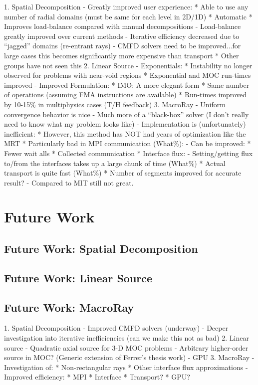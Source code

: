 {{    1. Spatial Decomposition
      - Greatly improved user experience:
        * Able to use any number of radial domains (must be same for each level in 2D/1D)
        * Automatic
        * Improves load-balance compared with manual decompositions
      - Load-balance greatly improved over current methods
      - Iterative efficiency decreased due to ``jagged'' domains (re-entrant rays)
      - CMFD solvers need to be improved...for large cases this becomes significantly more expensive than transport
        * Other groups have not seen this
    2. Linear Source
      - Exponentials:
        * Instability no longer observed for problems with near-void regions
        * Exponential and MOC run-times improved
      - Improved Formulation:
        * IMO: A more elegant form
        * Same number of operations (assuming FMA instructions are available)
        * Run-times improved by 10-15\% in multiphysics cases (T/H feedback)
    3. MacroRay
      - Uniform convergence behavior is nice
      - Much more of a ``black-box'' solver (I don't really need to know what my problem looks like)
      - Implementation is (unfortunately) inefficient:
        * However, this method has NOT had years of optimization like the MRT
        * Particularly bad in MPI communication (What\%):
          - Can be improved:
            * Fewer wait alls
            * Collected communication
        * Interface flux:
          - Setting/getting flux to/from the interfaces takes up a large chunk of time (What\%)
        * Actual transport is quite fast (What\%)
        * Number of segments improved for accurate result?
      - Compared to MIT still not great.
  }

  \section{Future Work}{\label{sec:Future Work}

    \subsection{Future Work: Spatial Decomposition}{\label{ssec:Future Work:Spatial Decomposition}
    }

    \subsection{Future Work: Linear Source}{\label{ssec:Future Work:Linear Source}
    }

    \subsection{Future Work: MacroRay}{\label{ssec:Future Work:MacroRay}
    }
    1. Spatial Decomposition
      - Improved CMFD solvers (underway)
      - Deeper investigation into iterative inefficiencies (can we make this not as bad)
    2. Linear source
      - Quadratic axial source for 3-D MOC problems
      - Arbitrary higher-order source in MOC? (Generic extension of Ferrer's thesis work)
      - GPU
    3. MacroRay
      - Investigation of:
        * Non-rectangular rays
        * Other interface flux approximations
      - Improved efficiency:
        * MPI
        * Interface
        * Transport?
        * GPU?
  }

  \printbibliography
}